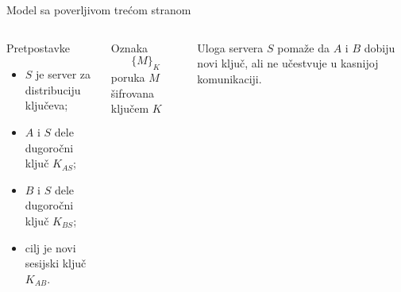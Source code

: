 \documentclass[aspectratio=1610]{beamer}
\newcommand{\enc}[2]{\{#1\}_{#2}}
\begin{document}
\begin{frame}[t]{Model sa poverljivom trećom stranom}
\small
\begin{columns}[T,onlytextwidth]
\begin{block}{Pretpostavke}
\begin{itemize}
    \item $S$ je server za distribuciju ključeva;
    \item $A$ i $S$ dele dugoročni ključ $K_{AS}$;
    \item $B$ i $S$ dele dugoročni ključ $K_{BS}$;
    \item cilj je novi sesijski ključ $K_{AB}$.
\end{itemize}
\end{block}

\begin{block}{Oznaka}
\[
\enc{M}{K}
\]
\centering
poruka $M$ šifrovana ključem $K$
\end{block}

\centering
{}

\vspace{0.7em}
\begin{alertblock}{Uloga servera}
$S$ pomaže da $A$ i $B$ dobiju novi ključ, ali ne učestvuje u kasnijoj komunikaciji.
\end{alertblock}
\end{columns}
\end{frame}
\end{document}
